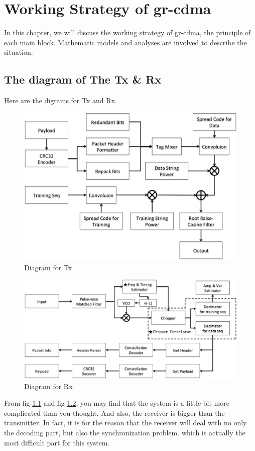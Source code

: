 \chapter{Working Strategy of gr-cdma}
In this chapter, we will discuss the working strategy of gr-cdma, the principle of each main block.
Mathematic models and analyses are involved to describe the situation.

\section{The diagram of The Tx \& Rx}
Here are the digrams for Tx and Rx. 
\begin{figure}[!ht]
	\centering
	\includegraphics[width = 5 in]{figure/tx-diagram.png}
	\caption{Diagram for Tx}
	\label{fig:diagram for Tx}
\end{figure}
\begin{figure}[!ht]
	\centering
	\includegraphics[width = 5in]{figure/rx-diagram.png}
	\caption{Diagram for Rx}
	\label{fig:diagram for Rx}
\end{figure}

From fig \ref{fig:diagram for Tx} and fig \ref{fig:diagram for Rx}, you may find that the system is a little bit more complicated than you thought. And also, the receiver is bigger than the transmitter. In fact, it is for the reason that the receiver will deal with no only the decoding part, but also the synchronization problem. which is actually the most difficult part for this system.

